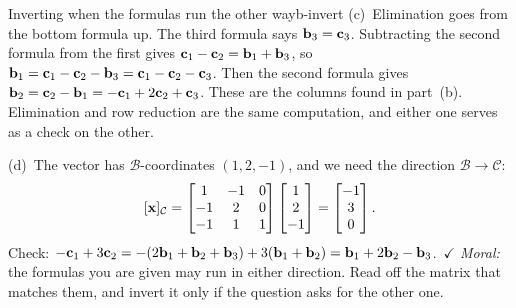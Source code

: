 \documentclass[11pt]{article}
\begin{document}
\begin{exmp}{Inverting when the formulas run the other way}{b-invert}
(c)~Elimination goes from the bottom formula up. The third formula says $\mathbf{b}_3=\mathbf{c}_3$. Subtracting the second formula from the first gives $\mathbf{c}_1-\mathbf{c}_2=\mathbf{b}_1+\mathbf{b}_3$, so $\mathbf{b}_1=\mathbf{c}_1-\mathbf{c}_2-\mathbf{b}_3=\mathbf{c}_1-\mathbf{c}_2-\mathbf{c}_3$. Then the second formula gives $\mathbf{b}_2=\mathbf{c}_2-\mathbf{b}_1=-\mathbf{c}_1+2\mathbf{c}_2+\mathbf{c}_3$. These are the columns found in part~(b). Elimination and row reduction are the same computation, and either one serves as a check on the other.

(d)~The vector has $\mathcal{B}$-coordinates $(1,2,-1)$, and we need the direction $\mathcal{B}\to\mathcal{C}$:
\[
[\mathbf{x}]_{\mathcal{C}}=\begin{bmatrix}1&-1&0\\-1&2&0\\-1&1&1\end{bmatrix}\begin{bmatrix}1\\2\\-1\end{bmatrix}=\begin{bmatrix}-1\\3\\0\end{bmatrix}.
\]
Check: $-\mathbf{c}_1+3\mathbf{c}_2=-(2\mathbf{b}_1+\mathbf{b}_2+\mathbf{b}_3)+3(\mathbf{b}_1+\mathbf{b}_2)=\mathbf{b}_1+2\mathbf{b}_2-\mathbf{b}_3$.\ $\checkmark$ \emph{Moral:} the formulas you are given may run in either direction. Read off the matrix that matches them, and invert it only if the question asks for the other one.
\end{exmp}
\end{document}
